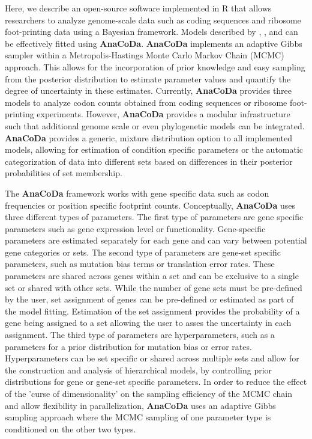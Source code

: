 \documentclass{bioinfo}
\newcommand{\package}{\textbf{AnaCoDa }} %
\newcommand{\packagee}{\textbf{AnaCoDa}}
\begin{document}
Here, we describe an open-source software implemented in R \citep{rcore} that allows researchers to analyze genome-scale data such as coding sequences and ribosome foot-printing data using a Bayesian framework. Models described by \citet{gilchrist2015}, \citet{wallace2013}, and \citet{shah2011} can be effectively fitted using \packagee. 
\package implements an adaptive Gibbs sampler within a Metropolis-Hastings Monte Carlo Markov Chain (MCMC) approach. This allows for the incorporation of prior knowledge and easy sampling from the posterior distribution to estimate parameter values and quantify the degree of uncertainty in these estimates.
Currently, \package provides three models to analyze codon counts obtained from coding sequences or ribosome foot-printing experiments. However, \package provides a modular infrastructure such that additional genome scale or even phylogenetic models can be integrated. 
\package provides a generic, mixture distribution option to all implemented models, allowing for estimation of condition specific parameters or the automatic categorization of data into different sets based on differences in their posterior probabilities of set membership.

The \package framework works with gene specific data such as codon frequencies or position specific footprint counts.
Conceptually, \package uses three different types of parameters.
The first type of parameters are gene specific parameters such as gene expression level or functionality.
Gene-specific parameters are estimated separately for each gene and can vary between potential gene categories or sets.
The second type of parameters are gene-set specific parameters, such as mutation bias terms or translation error rates.
These parameters are shared across genes within a set and can be exclusive to a single set or shared with other sets.
While the number of gene sets must be pre-defined by the user, set assignment of genes can be pre-defined or estimated as part of the model fitting.
Estimation of the set assignment provides the probability of a gene being assigned to a set allowing the user to asses the uncertainty in each assignment.
The third type of parameters are hyperparameters, such as a parameters for a prior distribution for mutation bias or error rates.
Hyperparameters can be set specific or shared across multiple sets and allow for the construction and analysis of hierarchical models, by controlling prior distributions for gene or gene-set specific parameters.
In order to reduce the effect of the 'curse of dimensionality' on the sampling efficiency of the MCMC chain and allow flexibility in parallelization, \package uses an adaptive Gibbs sampling approach where the MCMC sampling of one parameter type is conditioned on the other two types.
\end{document}
